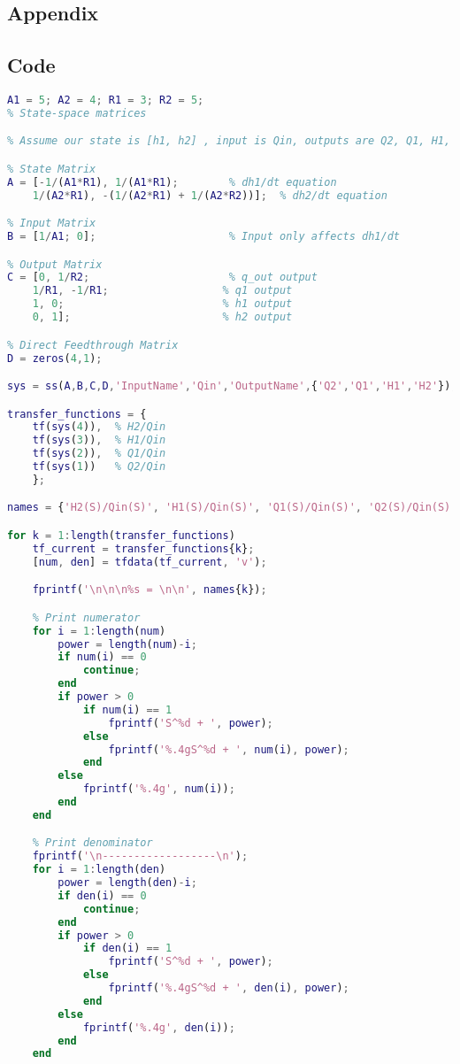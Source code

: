 \documentclass{report}
\begin{document}
\begin{flushleft}
\appendix
\chapter{Appendix}
\section{Code}
\begin{lstlisting}[language=Matlab, caption=project code,label=lst:code]
A1 = 5; A2 = 4; R1 = 3; R2 = 5;
% State-space matrices

% Assume our state is [h1, h2] , input is Qin, outputs are Q2, Q1, H1, H2

% State Matrix
A = [-1/(A1*R1), 1/(A1*R1);        % dh1/dt equation
    1/(A2*R1), -(1/(A2*R1) + 1/(A2*R2))];  % dh2/dt equation

% Input Matrix
B = [1/A1; 0];                     % Input only affects dh1/dt

% Output Matrix
C = [0, 1/R2;                      % q_out output
    1/R1, -1/R1;                  % q1 output
    1, 0;                         % h1 output
    0, 1];                        % h2 output

% Direct Feedthrough Matrix
D = zeros(4,1);

sys = ss(A,B,C,D,'InputName','Qin','OutputName',{'Q2','Q1','H1','H2'});

transfer_functions = {
    tf(sys(4)),  % H2/Qin
    tf(sys(3)),  % H1/Qin
    tf(sys(2)),  % Q1/Qin
    tf(sys(1))   % Q2/Qin
    };

names = {'H2(S)/Qin(S)', 'H1(S)/Qin(S)', 'Q1(S)/Qin(S)', 'Q2(S)/Qin(S)'};

for k = 1:length(transfer_functions)
    tf_current = transfer_functions{k};
    [num, den] = tfdata(tf_current, 'v');

    fprintf('\n\n\n%s = \n\n', names{k});

    % Print numerator
    for i = 1:length(num)
        power = length(num)-i;
        if num(i) == 0
            continue;
        end
        if power > 0
            if num(i) == 1
                fprintf('S^%d + ', power);
            else
                fprintf('%.4gS^%d + ', num(i), power);
            end
        else
            fprintf('%.4g', num(i));
        end
    end

    % Print denominator
    fprintf('\n------------------\n');
    for i = 1:length(den)
        power = length(den)-i;
        if den(i) == 0
            continue;
        end
        if power > 0
            if den(i) == 1
                fprintf('S^%d + ', power);
            else
                fprintf('%.4gS^%d + ', den(i), power);
            end
        else
            fprintf('%.4g', den(i));
        end
    end


\end{lstlisting}
\end{flushleft}
\end{document}
